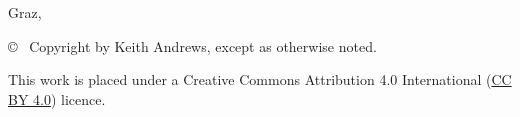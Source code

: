 \begin{center}
    \vspace{1cm}

    {\normalsize\sffamily Graz, \thisdate}



    \vfill

    {\footnotesize\sffamily \copyright ~ Copyright \thisyear by Keith Andrews,
        except as otherwise noted.}

    {\footnotesize\sffamily This work is placed under a
        Creative Commons Attribution 4.0 International
        (\href{https://creativecommons.org/licenses/by/4.0/}{CC BY 4.0}) licence.}


\end{center}






\cleardoublepage

